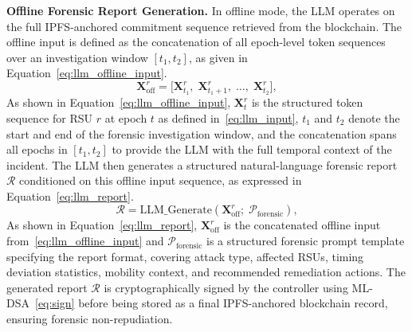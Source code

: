 \textbf{Offline Forensic Report Generation.}
In offline mode, the LLM operates on the full IPFS-anchored
commitment sequence retrieved from the blockchain. The offline
input is defined as the concatenation of all epoch-level token
sequences over an investigation window $[t_1, t_2]$, as given
in Equation~\eqref{eq:llm_offline_input}.
\begin{equation}
\mathbf{X}_{\mathrm{off}}^r =
  \bigl[\mathbf{X}_{t_1}^r,\;
  \mathbf{X}_{t_1+1}^r,\;\ldots,\;
  \mathbf{X}_{t_2}^r\bigr],
\label{eq:llm_offline_input}
\end{equation}
As shown in Equation~\eqref{eq:llm_offline_input},
$\mathbf{X}_{t}^r$ is the structured token sequence for RSU $r$
at epoch $t$ as defined in~\eqref{eq:llm_input},
$t_1$ and $t_2$ denote the start and end of the forensic
investigation window, and the concatenation spans all epochs
in $[t_1, t_2]$ to provide the LLM with the full temporal
context of the incident.
The LLM then generates a structured natural-language forensic
report $\mathcal{R}$ conditioned on this offline input
sequence, as expressed in Equation~\eqref{eq:llm_report}.
\begin{equation}
\mathcal{R} = \mathrm{LLM\_Generate}\!\left(
  \mathbf{X}_{\mathrm{off}}^r;\;
  \mathcal{P}_{\mathrm{forensic}}
\right),
\label{eq:llm_report}
\end{equation}
As shown in Equation~\eqref{eq:llm_report},
$\mathbf{X}_{\mathrm{off}}^r$ is the concatenated offline
input from~\eqref{eq:llm_offline_input} and
$\mathcal{P}_{\mathrm{forensic}}$ is a structured forensic
prompt template specifying the report format, covering attack
type, affected RSUs, timing deviation statistics, mobility
context, and recommended remediation actions. The generated
report $\mathcal{R}$ is cryptographically signed by the
controller using ML-DSA~\eqref{eq:sign} before being stored
as a final IPFS-anchored blockchain record, ensuring
forensic non-repudiation.

